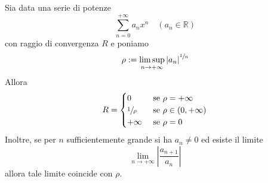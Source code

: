 \begin{proposition}[$**$]\label{prop: 4.8}
    Sia data una serie di potenze
    \[\sum_{n=0}^{+\infty} a_{n} x^{n} \quad\left(a_{n} \in \mathbb{R}\right)\]
    con raggio di convergenza $R$ e poniamo
    \[\rho:=\limsup _{n \rightarrow+\infty}\left|a_{n}\right|^{\sfrac{1}{n}}\]
    Allora
    \[R= \begin{cases}0 & \text { se } \rho=+\infty \\ \sfrac{1}{\rho} & \text { se } \rho \in(0,+\infty) \\ +\infty & \text { se } \rho=0\end{cases}\]
    Inoltre, se per $n$ sufficientemente grande si ha $a_{n} \neq 0$ ed esiste il limite
    \[\lim _{n \rightarrow+\infty}\left|\frac{a_{n+1}}{a_{n}}\right|\]
    allora tale limite coincide con $\rho$.
\end{proposition}
